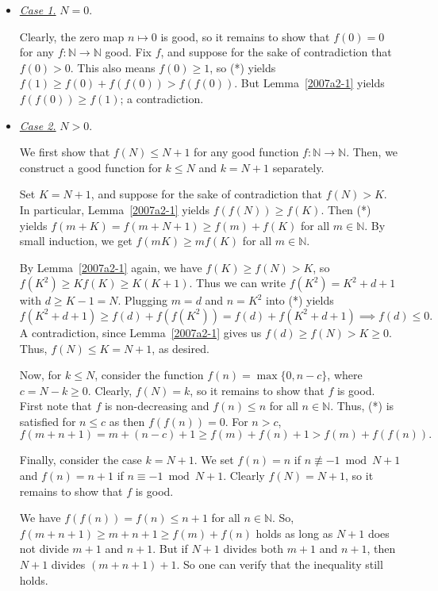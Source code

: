 \documentclass{article}
\newcommand{\N}{\mathbb{N}}
\begin{document}
\begin{itemize}

    \item
    \textit{\underline{Case 1.}}
    $N = 0$.

    Clearly, the zero map $n \mapsto 0$ is good, so it remains to show that $f(0) = 0$ for any $f : \N \to \N$ good.
    Fix $f$, and suppose for the sake of contradiction that $f(0) > 0$.
    This also means $f(0) \geq 1$, so (*) yields $f(1) \geq f(0) + f(f(0)) > f(f(0))$.
    But Lemma~\ref{2007a2-1} yields $f(f(0)) \geq f(1)$; a contradiction.

    \item
    \textit{\underline{Case 2.}}
    $N > 0$.

    We first show that $f(N) \leq N + 1$ for any good function $f : \N \to \N$.
    Then, we construct a good function for $k \leq N$ and $k = N + 1$ separately.

    Set $K = N + 1$, and suppose for the sake of contradiction that $f(N) > K$.
    In particular, Lemma~\ref{2007a2-1} yields $f(f(N)) \geq f(K)$.
    Then (*) yields $f(m + K) = f(m + N + 1) \geq f(m) + f(K)$ for all $m \in \N$.
    By small induction, we get $f(mK) \geq m f(K)$ for all $m \in \N$.

    By Lemma~\ref{2007a2-1} again, we have $f(K) \geq f(N) > K$, so $f(K^2) \geq K f(K) \geq K (K + 1)$.
    Thus we can write $f(K^2) = K^2 + d + 1$ with $d \geq K - 1 = N$.
    Plugging $m = d$ and $n = K^2$ into (*) yields
    \[ f(K^2 + d + 1) \geq f(d) + f(f(K^2)) = f(d) + f(K^2 + d + 1) \implies f(d) \leq 0. \]
    A contradiction, since Lemma~\ref{2007a2-1} gives us $f(d) \geq f(N) > K \geq 0$.
    Thus, $f(N) \leq K = N + 1$, as desired.

    Now, for $k \leq N$, consider the function $f(n) = \max\{0, n - c\}$, where $c = N - k \geq 0$.
    Clearly, $f(N) = k$, so it remains to show that $f$ is good.
    First note that $f$ is non-decreasing and $f(n) \leq n$ for all $n \in \N$.
    Thus, (*) is satisfied for $n \leq c$ as then $f(f(n)) = 0$.
    For $n > c$,
    \[ f(m + n + 1) = m + (n - c) + 1 \geq f(m) + f(n) + 1 > f(m) + f(f(n)). \]

    Finally, consider the case $k = N + 1$.
    We set $f(n) = n$ if $n \not\equiv -1 \bmod{N + 1}$ and $f(n) = n + 1$ if $n \equiv -1 \bmod{N + 1}$.
    Clearly $f(N) = N + 1$, so it remains to show that $f$ is good.
    
    We have $f(f(n)) = f(n) \leq n + 1$ for all $n \in \N$.
    So, $f(m + n + 1) \geq m + n + 1 \geq f(m) + f(n)$ holds as long as $N + 1$ does not divide $m + 1$ and $n + 1$.
    But if $N + 1$ divides both $m + 1$ and $n + 1$, then $N + 1$ divides $(m + n + 1) + 1$.
    So one can verify that the inequality still holds.

\end{itemize}
\end{document}
